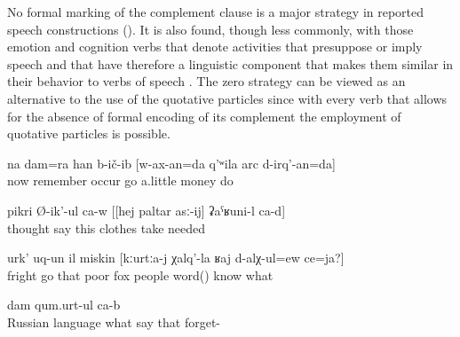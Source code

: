 No formal marking of the complement clause is a major strategy in reported speech constructions (). It is also found, though less commonly, with those emotion and cognition verbs that denote activities that presuppose or imply speech and that have therefore a linguistic component that makes them similar in their behavior to verbs of speech . The zero strategy can be viewed as an alternative to the use of the quotative particles since with every verb that allows for the absence of formal encoding of its complement the employment of quotative particles is possible.
%
\begin{exe}
	\ex	\label{ex:‎I also thought, I should go to make a little money}
	\gll	na	dam=ra	han	b-ič-ib	[w-ax-an=da	q'ʷila	arc	d-irq'-an=da]\\
		now		remember	occur	go	a.little	money	do\\
	\glt	{}

	\ex	\label{ex:‎He thinks, I need to take these clothes}
	\gll	pikri	Ø-ik'-ul	ca-w	[[hej	paltar	asː-ij]	ʡaˁʁuni-l	ca-d]\\
		thought	say		this	clothes	take	needed	\\
	\glt	{}

		\ex	\label{ex:‎‎‎The poor boy got frightened}
	\gll	urk'	uq-un	il	miskin	[kːurtːa-j	χalq'-la	ʁaj	d-alχ-ul=ew	ce=ja?]\\
		fright	go	that	poor	fox	people	word()	know	what\\
	\glt	{}
	
	\ex	\label{ex:‎It is called something in Russian, I forgot}
	\gll	[ʡuˁrus	ʁaj-la	ce=jal	b-ik'-ul	ca-b	it-i-j]	dam	qum.urt-ul	ca-b\\
		Russian	language	what	say		that		forget-	\\
	\glt	{}
\end{exe}

